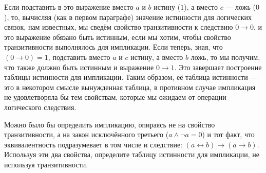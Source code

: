 Если подставить в это выражение вместо $a$ и $b$ истину ($1$), а вместо $c$ --- ложь ($0$), то, вычисляя (как в первом параграфе) значение истинности для логических связок, нам известных, мы сведём свойство транзитивности к следствию $0 \to 0$, и это выражение обязано быть истинным, если мы хотим, чтобы свойство транзитивности выполнялось для импликации. Если теперь, зная, что $(0 \to 0) = 1$, подставить вместо $a$ и $c$ истину, а вместо $b$ ложь, то мы получим, что также должно быть истинным и выражение $0 \to 1$. Это завершает построение таблицы истинности для импликации. Таким образом, её таблица истинности --- это в некотором смысле вынужденная таблица, в противном случае импликация не удовлетворяла бы тем свойствам, которые мы ожидаем от операции логического следствия.

\begin{exercise}Можно было бы определить импликацию, опираясь не на свойство транзитивности, а на закон исключённого третьего ($a \land \neg a = 0$) и тот факт, что эквивалентность подразумевает в том числе и следствие: $(a \leftrightarrow b) \to (a \to b)$. Используя эти два свойства, определите таблицу истинности для импликации, не используя транзитивности.\end{exercise}
